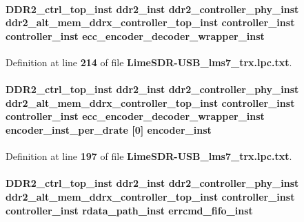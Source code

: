 \paragraph[{ecc\+\_\+encoder\+\_\+decoder\+\_\+wrapper\+\_\+inst}]{ {\bf D\+D\+R2\+\_\+ctrl\+\_\+top\+\_\+inst} {\bf ddr2\+\_\+inst} {\bf ddr2\+\_\+controller\+\_\+phy\+\_\+inst} {\bf ddr2\+\_\+alt\+\_\+mem\+\_\+ddrx\+\_\+controller\+\_\+top\+\_\+inst} {\bf controller\+\_\+inst} {\bf controller\+\_\+inst} ecc\+\_\+encoder\+\_\+decoder\+\_\+wrapper\+\_\+inst}\label{LimeSDR-USB__lms7__trx_8lpc_8txt_a474ea4080bb3a930c5bb9e2fd17477c1}


Definition at line {\bf 214} of file {\bf Lime\+S\+D\+R-\/\+U\+S\+B\+\_\+lms7\+\_\+trx.\+lpc.\+txt}.

\paragraph[{encoder\+\_\+inst}]{ {\bf D\+D\+R2\+\_\+ctrl\+\_\+top\+\_\+inst} {\bf ddr2\+\_\+inst} {\bf ddr2\+\_\+controller\+\_\+phy\+\_\+inst} {\bf ddr2\+\_\+alt\+\_\+mem\+\_\+ddrx\+\_\+controller\+\_\+top\+\_\+inst} {\bf controller\+\_\+inst} {\bf controller\+\_\+inst} {\bf ecc\+\_\+encoder\+\_\+decoder\+\_\+wrapper\+\_\+inst} encoder\+\_\+inst\+\_\+per\+\_\+drate [0] encoder\+\_\+inst}\label{LimeSDR-USB__lms7__trx_8lpc_8txt_ab77889e6bcf36916a4f0b7f891b9d572}


Definition at line {\bf 197} of file {\bf Lime\+S\+D\+R-\/\+U\+S\+B\+\_\+lms7\+\_\+trx.\+lpc.\+txt}.

\paragraph[{errcmd\+\_\+fifo\+\_\+inst}]{ {\bf D\+D\+R2\+\_\+ctrl\+\_\+top\+\_\+inst} {\bf ddr2\+\_\+inst} {\bf ddr2\+\_\+controller\+\_\+phy\+\_\+inst} {\bf ddr2\+\_\+alt\+\_\+mem\+\_\+ddrx\+\_\+controller\+\_\+top\+\_\+inst} {\bf controller\+\_\+inst} {\bf controller\+\_\+inst} {\bf rdata\+\_\+path\+\_\+inst} errcmd\+\_\+fifo\+\_\+inst}\label{LimeSDR-USB__lms7__trx_8lpc_8txt_a622e376dc4949d7ba7cef9cbea2e8be4}



